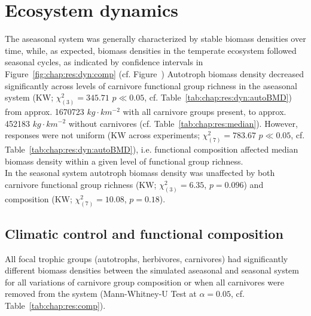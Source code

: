\section{Ecosystem dynamics}
\label{chap:res:dyn} 
The aseasonal system was generally characterized by stable biomass densities over time, while, 
as expected, biomass densities in the temperate ecosystem followed seasonal cycles, as indicated by confidence intervals in Figure~\ref{fig:chap:res:dyn:comp} (cf. Figure~) 
Autotroph biomass density decreased significantly across levels of carnivore functional group richness in the aseasonal system (KW; $\chi^{2}_{(3)} = 345.71$ $p \ll 0.05$, cf. Table~\ref{tab:chap:res:dyn:autoBMD}) from approx. 1670723 $kg\cdot km^{-2}$ with all carnivore groups present, to approx. 452183 $kg\cdot km^{-2}$ without carnivores (cf. Table~\ref{tab:chap:res:median}). 
However, responses were not uniform (KW across experiments; $\chi^{2}_{(7)} = 783.67$ $p \ll 0.05$, cf. Table~\ref{tab:chap:res:dyn:autoBMD}), i.e. functional composition affected median biomass density within a given level of functional group richness. \\
In the seasonal system autotroph biomass density was unaffected by both carnivore functional group richness (KW; $\chi^{2}_{(3)} = 6.35$, $p = 0.096$) and composition (KW; $\chi^{2}_{(7)} = 10.08$, $p = 0.18$).



\subsection{Climatic control and functional composition}
\label{chap:res:diff}
All focal trophic groups (autotrophs, herbivores, carnivores) had significantly different biomass densities between the simulated aseasonal and seasonal system for all variations of carnivore group composition or when all carnivores were removed from the system (Mann-Whitney-U Test at $\alpha = 0.05$, cf. Table~\ref{tab:chap:res:comp}).\\\\

